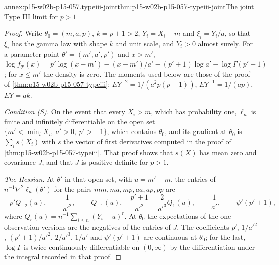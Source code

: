 \begin{annexitem}{annex:p15-w02b-p15-057.typeiii-joint}{thm:p15-w02b-p15-057-typeiii-joint}{The joint Type III limit for \(p>1\)}
\begin{proof}
Write \(\theta_0=(m,a,p)\), \(k=p+1>2\), \(Y_i=X_i-m\) and
\(\xi_i=Y_i/a\), so that \(\xi_i\) has the gamma law with shape \(k\) and
unit scale, and \(Y_i>0\) almost surely. For a parameter point
\(\theta'=(m',a',p')\) and \(x>m'\),
\(\log f_{\theta'}(x)=p'\log(x-m')-(x-m')/a'-(p'+1)\log a'-\log\Gamma(p'+1)\);
for \(x\leq m'\) the density is zero. The moments used below are those of
the proof of \cref{thm:p15-w02b-p15-057-typeiii}:
\(EY^{-2}=1/(a^2p(p-1))\), \(EY^{-1}=1/(ap)\), \(EY=ak\).

\emph{Condition (S).} On the event that every \(X_i>m\), which has
probability one, \(\ell_n\) is finite and infinitely differentiable on
the open set \(\{m'<\min_iX_i,\ a'>0,\ p'>-1\}\), which contains
\(\theta_0\), and its gradient at \(\theta_0\) is \(\sum_is(X_i)\) with
\(s\) the vector of first derivatives computed in the proof of
\cref{thm:p15-w02b-p15-057-typeiii}. That proof shows that \(s(X)\) has mean
zero and covariance \(J\), and that \(J\) is positive definite for
\(p>1\).

\emph{The Hessian.} At \(\theta'\) in that open set, with
\(u=m'-m\), the entries of \(n^{-1}\nabla^2\ell_n(\theta')\) for the
pairs \(mm,ma,mp,aa,ap,pp\) are
\[
 -p'Q_{-2}(u),\quad -\frac1{a'^2},\quad -Q_{-1}(u),\quad
 \frac{p'+1}{a'^2}-\frac{2}{a'^3}Q_1(u),\quad -\frac1{a'},\quad
 -\psi'(p'+1),
\]
where \(Q_r(u)=n^{-1}\sum_{i\leq n}(Y_i-u)^r\). At \(\theta_0\) the
expectations of the one-observation versions are the negatives of the
entries of \(J\). The coefficients \(p'\), \(1/a'^2\), \((p'+1)/a'^2\),
\(2/a'^3\), \(1/a'\) and \(\psi'(p'+1)\) are continuous at \(\theta_0\);
for the last, \(\log\Gamma\) is twice continuously differentiable on
\((0,\infty)\) by the differentiation under the integral recorded in that
proof.


\end{proof}
\end{annexitem}

